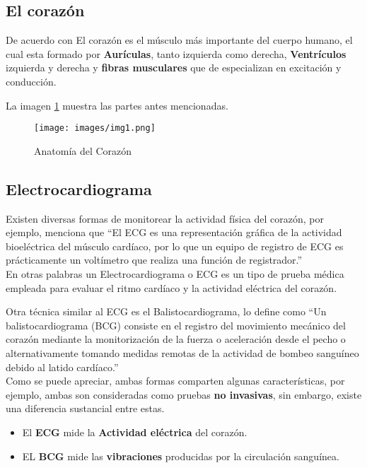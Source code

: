     \subsection{El corazón}
    De acuerdo con \citet[p. 36]{bib13} El corazón es el músculo más importante del cuerpo humano, el cual esta formado por \textbf{Aurículas}, tanto izquierda como derecha, \textbf{Ventrículos} izquierda y derecha y \textbf{fibras musculares} que de especializan en excitación y conducción.

    La imagen \ref{fig:ant_corazón} muestra las partes antes mencionadas.

    \begin{figure}[!ht]
        \centering
        \texttt{[image: images/img1.png]}
        \caption{Anatomía del Corazón \citep{bib16}}
        \label{fig:ant_corazón}
    \end{figure}
    
    \subsection{Electrocardiograma}
    Existen diversas formas de monitorear la actividad física del corazón, por ejemplo, \citet[p. 1]{bib2} menciona que ``El ECG es una representación gráfica de la actividad bioeléctrica del músculo cardíaco, por lo que un equipo de registro de ECG es prácticamente un voltímetro que realiza una función de registrador.''\\
    En otras palabras un Electrocardiograma o ECG es un tipo de prueba médica empleada para evaluar el ritmo cardíaco y la actividad eléctrica del corazón.

    Otra técnica similar al ECG es el Balistocardiograma, \citet[p. 1]{bib3} lo define como ``Un balistocardiograma (BCG) consiste en el registro del movimiento mecánico del corazón mediante la monitorización de la fuerza o aceleración desde el pecho o alternativamente tomando medidas remotas de la actividad de bombeo sanguíneo debido al latido cardíaco.''\\
    Como se puede apreciar, ambas formas comparten algunas características, por ejemplo, ambas son consideradas como pruebas \textbf{no invasivas}, sin embargo, existe una diferencia sustancial entre estas.

    \begin{itemize}
        \item El \textbf{ECG} mide la \textbf{Actividad eléctrica} del corazón.
        \item EL \textbf{BCG} mide las \textbf{vibraciones} producidas por la circulación sanguínea.
    \end{itemize}

